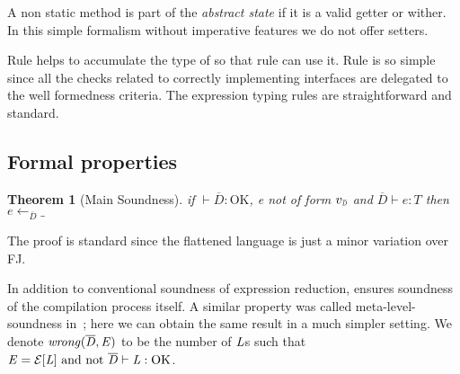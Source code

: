 \noindent A non static method is part of the \emph{abstract state} if 
it is a valid getter or wither. In this simple formalism without imperative features we do not offer setters.


Rule  helps to accumulate the type of \Q@this@ so that rule 
can use it.
Rule  is so simple since all the checks
related to correctly implementing interfaces are delegated to the well formedness criteria.
The expression typing rules are straightforward and standard.

\saveSpace
\subsection{Formal properties}
\saveSpace
\newtheorem{theorem}{Theorem}[section]
\begin{theorem}[Main Soundness]
if $\vdash\overline{D}:\text{OK}$,
e not of form $v_{{\smallDs}}$
and $\overline{D}\vdash e:T$
then
$e\leftarrow_{\overline{D}} \_$
\end{theorem}
\saveSpace\saveSpace\saveSpace
\noindent The proof is standard since the flattened language is just a minor variation over FJ.

In addition to conventional soundness of expression reduction,
\name ensures soundness of the compilation process itself.
A similar property was called meta-level-soundness in~\cite{servetto2014meta}; here we can obtain the same result in
a much simpler setting.
We denote $\mathit{wrong}(\overline{\mathit{D}},\mathit{E})$ to be the number of $\mathit{L}$s such that
$\mE=\ctx[\mL]\ \text{and not}\ \overline\mD\vdash\mL:\text{OK}$.


